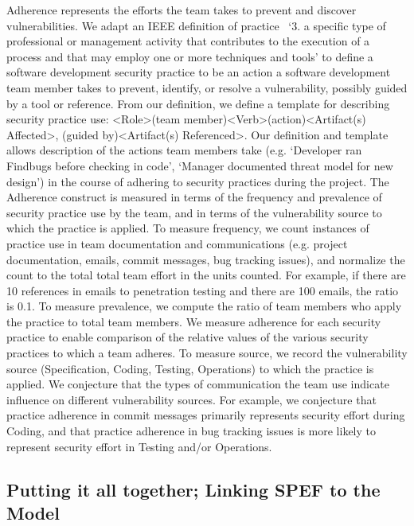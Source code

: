 Adherence represents the efforts the team takes to prevent and discover vulnerabilities. We adapt an IEEE definition of practice~\cite{ieee1990glossary} `3. a specific type of professional or management activity that contributes to 
the execution of a process and that may employ one or more techniques and tools' to define a software development security practice to be an action a software development team member takes to prevent, identify, or resolve a vulnerability, possibly guided by a tool or reference. From our definition, we define a template for describing security practice use: \textless Role\textgreater (team member)\textless Verb\textgreater (action)\textless Artifact(s) Affected\textgreater, (guided by)\textless Artifact(s) Referenced\textgreater. Our definition and template allows description of the actions team members take (e.g. `Developer ran Findbugs before checking in code', `Manager documented threat model for new design') in the course of adhering to security practices during the project. The Adherence construct is measured in terms of the frequency and prevalence of security practice use by the team, and in terms of the vulnerability source to which the practice is applied. To measure frequency, we count instances of practice use in team documentation and communications (e.g. project documentation, emails, commit messages, bug tracking issues), and normalize the count to the total total team effort in the units counted. For example, if there are 10 references in emails to penetration testing and there are 100 emails, the ratio is 0.1.  To measure prevalence, we compute the ratio of team members who apply the practice to total team members. We measure adherence for each security practice to enable comparison of the relative values of the various security practices to which a team adheres. To measure source, we record the vulnerability source (Specification, Coding, Testing, Operations) to which the practice is applied. We conjecture that the types of communication the team use indicate influence on different vulnerability sources. For example, we conjecture that practice adherence in commit messages primarily represents security effort during Coding,  and that practice adherence in bug tracking issues is more likely to represent security effort in Testing and/or Operations. 

\subsection{Putting it all together; Linking SPEF to the Model}

